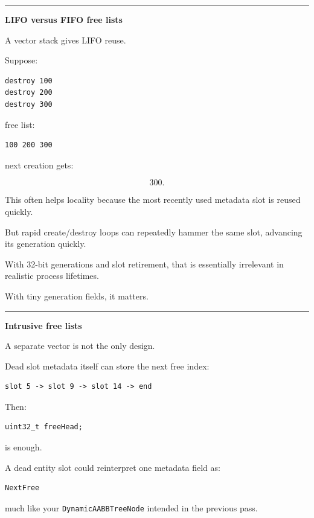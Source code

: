 \begin{center}\rule{0.5\linewidth}{0.5pt}\end{center}

\textbf{LIFO versus FIFO free lists}

A vector stack gives LIFO reuse.

Suppose:

\begin{verbatim}
destroy 100
destroy 200
destroy 300
\end{verbatim}

free list:

\begin{verbatim}
100 200 300
\end{verbatim}

next creation gets:

\[
300.
\]

This often helps locality because the most recently used metadata slot is reused quickly.

But rapid create/destroy loops can repeatedly hammer the same slot, advancing its generation quickly.

With 32-bit generations and slot retirement, that is essentially irrelevant in realistic process lifetimes.

With tiny generation fields, it matters.

\begin{center}\rule{0.5\linewidth}{0.5pt}\end{center}

\textbf{Intrusive free lists}

A separate vector is not the only design.

Dead slot metadata itself can store the next free index:

\begin{verbatim}
slot 5 -> slot 9 -> slot 14 -> end
\end{verbatim}

Then:

\begin{verbatim}
uint32_t freeHead;
\end{verbatim}

is enough.

A dead entity slot could reinterpret one metadata field as:

\begin{verbatim}
NextFree
\end{verbatim}

much like your \texttt{DynamicAABBTreeNode} intended in the previous pass.

